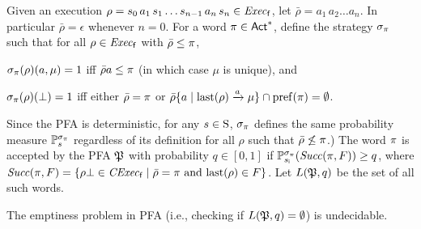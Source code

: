 Given an execution
$\rho = s_0\,a_1\,s_1\ldots s_{n-1}\,a_n\,s_n \in \execf$,
let $\bar{\rho} = a_1\, a_2\ldots a_n$.  In particular
$\bar{\rho} = \epsilon$ whenever $n=0$.
%
For a word $\plan\in\Act^*$, define the strategy $\strat_\plan$ such
that for all $\rho\in\execf$ with $\bar{\rho}\leq\plan$,
%
\begin{enumerate*}[(i)]
\item%
  $\strat_\plan(\rho)(a,\mu)=1$ iff $\bar{\rho}a\leq\plan$ (in which
  case $\mu$ is unique), and
\item%
  $\strat_\plan(\rho)(\complete)=1$ iff either $\bar{\rho}=\plan$ or
  $\bar{\rho}\{a\mid{\last(\rho)\reach{a}\mu}\}\cap\pref(\plan) = \emptyset$.
\end{enumerate*}
%
Since the PFA is deterministic, for any $s\in\S$, $\strat_\plan$
defines the same probability measure $\Prob_s^{\strat_\plan}$
regardless of its definition for all $\rho$ such that
$\bar{\rho}\not\leq\plan$.) 
%
The word $\plan$ is accepted by the PFA $\pfa$ with probability
$q\in[0,1]$ if $\Prob_{\sini}^{\strat_\plan}(\Succ(\plan,F))\geq q$, where
$\Succ(\plan,F)=\{{\rho\complete\in\cexecf}\mid{\bar{\rho}=\plan \text{ and } \last(\rho)\in F}\}$.
%
Let $L(\pfa,q)$ be the set of all such words.

\begin{proposition}{\cite{Paz71,MadaniHC99}}\label{prop:empty:PFA:undecidable}
  The emptiness problem in PFA (i.e., checking if
  $L(\pfa,q)=\emptyset$) is undecidable.
\end{proposition}


